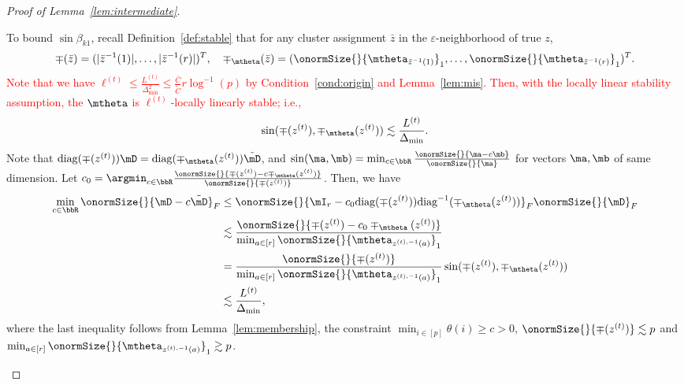 \documentclass[lettersize,onecolumn,journal]{IEEEtran}
\theoremstyle{definition}
\theoremstyle{definition}
\begin{document}
\begin{proof}[Proof of Lemma~\ref{lem:intermediate}]
\begin{enumerate}[wide]
    To bound $\sin \beta_{k1}$, recall Definition~\ref{def:stable} that for any cluster assignment $\bar z$ in the $\varepsilon$-neighborhood of true $z$,
    \begin{equation}
        \mp(\bar z)=(|\bar z^{-1}(1)|, \ldots,|\bar z^{-1}(r)|)^T,\quad \mp_{\mtheta}(\bar z)=(\onormSize{}{\mtheta_{\bar z^{-1}(1)}}_1,\ldots,\onormSize{}{\mtheta_{\bar z^{-1}(r)}}_1)^T.
    \end{equation}
     \textcolor{red}{Note that we have $\ell^{(t)} \leq \frac{L^{(t)}}{\Delta_{\min}^2} \leq \frac{\bar C}{\tilde C} r \log^{-1}(p) $ by Condition~\ref{cond:origin} and Lemma~\ref{lem:mis}. Then,  with the locally linear stability assumption, the $\mtheta$ is $\ell^{(t)}$-locally linearly stable; i.e.,}
    \begin{equation}
         \sin (\mp(z^{(t)}), \mp_{\mtheta}(z^{(t)})) \lesssim \frac{L^{(t)}}{\Delta_{\min}}. 
    \end{equation}
    Note that $\text{diag}(\mp(z^{(t)})) \mD = \text{diag}(\mp_{\mtheta}(z^{(t)})) \tilde \mD$, and $\sin(\ma,\mb) =\min_{c \in \bbR} \frac{ \onormSize{}{\ma - c\mb} }{\onormSize{}{\ma}}$ for vectors $\ma,\mb$ of same dimension. Let $c_0 = \argmin_{c \in \bbR} \frac{\onormSize{}{\mp(z^{(t)}) - c\mp_{\mtheta}(z^{(t)})}}{\onormSize{}{\mp(z^{(t)})}}$. Then, we have
    \begin{align}
      \min_{c \in \bbR} \onormSize{}{ \mD - c \tilde \mD}_F &\leq  \onormSize{}{ \mI_r - c_0 \text{diag}(\mp(z^{(t)})) \text{diag}^{-1}(\mp_{\mtheta}(z^{(t)}))}_F \onormSize{}{\mD}_F\\
      &\lesssim \frac{ \onormSize{}{ \mp(z^{(t)}) - c_0\mp_{\mtheta}(z^{(t)})} }{\min_{a \in [r]} \onormSize{}{\mtheta_{z^{(t),-1}(a)} }_1  } \\
      & = \frac{\onormSize{}{ \mp(z^{(t)})} }{\min_{a \in [r]} \onormSize{}{\mtheta_{z^{(t),-1}(a)} }_1 } \sin (\mp(z^{(t)}), \mp_{\mtheta}(z^{(t)}))\\
      & \lesssim \frac{L^{(t)}}{\Delta_{\min}},
    \end{align}
    where the last inequality follows from Lemma~\ref{lem:membership}, the constraint $\min_{i \in [p]}\theta(i) \geq c>0$, $\onormSize{}{ \mp(z^{(t)})} \lesssim p$ and $\min_{a \in [r]} \onormSize{}{\mtheta_{z^{(t),-1}(a)} }_1  \gtrsim p$. 
    

\end{enumerate}
\end{proof}
\end{document}
